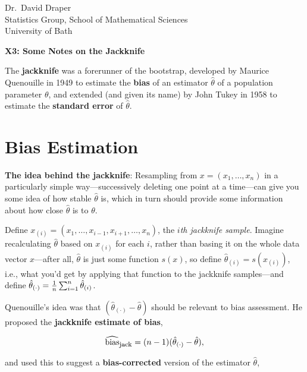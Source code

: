 \documentclass[11pt]{article}
\begin{document}
\begin{flushleft}
Dr.~David Draper\\
Statistics Group, School of Mathematical Sciences\\
University of Bath\\
\end{flushleft}

\begin{center}
{\Large
{\bf X3: Some Notes on the Jackknife}}
\end{center}
\smallskip
\smallskip

The {\bf jackknife} was a forerunner of the bootstrap, developed by
Maurice Quenouille in 1949 to estimate the {\bf bias} of an estimator
$\hat \theta$ of a population parameter $\theta$, and extended (and
given its name) by John Tukey in 1958 to estimate the {\bf standard
error} of $\hat \theta$.
\smallskip
\smallskip

\section*{Bias Estimation}

{\bf The idea behind the jackknife}: Resampling from $x = (x_1, \ldots,
x_n)$ in a particularly simple way---successively deleting one point at
a time---can give you some idea of how stable $\hat \theta$ is, which in
turn should provide some information about how close $\hat \theta$ is to
$\theta$.

Define $x_{(i)} = (x_1, \ldots, x_{i-1}, x_{i+1}, \ldots, x_n)$, the
{\it $i$th jackknife sample\/}. Imagine recalculating $\hat \theta$
based on $x_{(i)}$ for each $i$, rather than basing it on the whole data
vector $x$---after all, $\hat \theta$ is just some function $s(x)$, so
define ${\hat \theta}_{(i)} = s(x_{(i)})$, i.e., what you'd get by
applying that function to the jackknife samples---and define ${\hat
\theta}_{(\cdot)} = {1 \over n} \sum_{i=1}^n {\hat \theta}_{(i)}$.

Quenouille's idea was that $({\hat \theta}_{(\cdot)} - {\hat \theta})$
should be relevant to bias assessment. He proposed the {\bf jackknife
estimate of bias},

\begin{equation}
\widehat{\mbox{bias}}_{\mbox{\footnotesize jack}} = (n - 1) ({\hat
\theta}_{(\cdot)} - {\hat \theta}) ,
\end{equation}

and used this to suggest a {\bf bias-corrected}
version of the estimator $\hat \theta$,
\end{document}
